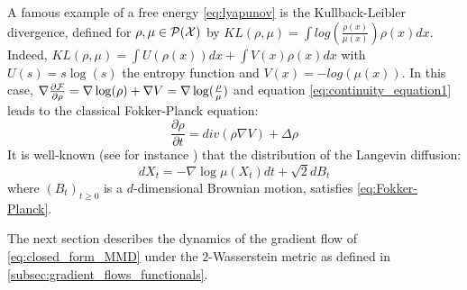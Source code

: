 \begin{remark} \label{rem:KL_Lyapunov}
	A famous example of a free energy \eqref{eq:lyapunov} is the Kullback-Leibler divergence, defined for $\rho, \mu \in \mathcal{P}({{\mathcal X}})$ by
	$KL(\rho,\mu)=\int log(\frac{\rho(x)}{\mu(x)})\rho(x)dx$. Indeed, $KL(\rho, \mu)=\int U(\rho(x))dx + \int V(x) \rho(x)dx$ with $U(s)=s\log(s)$ the entropy function and $V(x)=-log(\mu(x))$. In this case, $\nabla \frac{\partial {{\mathcal F}}}{\partial \rho}= \nabla \log(\rho) + \nabla V=  \nabla \log(\frac{\rho}{\mu})$ and equation \eqref{eq:continuity_equation1} leads to the classical Fokker-Planck equation:
	\begin{equation}\label{eq:Fokker-Planck}
	\frac{\partial{\rho}}{\partial t}= div(\rho \nabla V )+ \Delta \rho
	\end{equation}
It is well-known (see for instance \cite{jordan1998variational}) that the distribution of the Langevin diffusion:
	\begin{equation}\label{eq:langevin_diffusion}
	dX_t= -\nabla \log \mu (X_t)dt+\sqrt{2}dB_t
	\end{equation}
	where $(B_t)_{t\ge0}$ is a $d$-dimensional Brownian motion, satisfies \eqref{eq:Fokker-Planck}.
\end{remark}


The next section describes the dynamics of the gradient flow of \cref{eq:closed_form_MMD} under the $2$-Wasserstein metric as defined in \cref{subsec:gradient_flows_functionals}.


